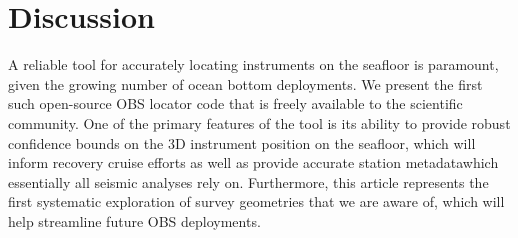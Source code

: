 \documentclass[10pt,titlepage]{article}
\providecommand{\DIFaddtex}[1]{{\protect\color{blue}\uwave{#1}}} %
\providecommand{\DIFaddbegin}{} %
\providecommand{\DIFaddend}{} %
\providecommand{\DIFdelbegin}{} %
\providecommand{\DIFdelend}{} %
\providecommand{\DIFadd}[1]{\texorpdfstring{\DIFaddtex{#1}}{#1}} %
\begin{document}
\DIFdelbegin %






\DIFdelend %
\section{Discussion }
A reliable tool for accurately locating instruments on the seafloor is paramount, given the growing number of ocean bottom deployments. We present the first such open-source OBS locator code that is freely available to the scientific community. One of the primary features of the tool is its ability to provide robust confidence bounds on the 3D instrument position on the seafloor, which will inform recovery cruise efforts as well as provide accurate station metadata\DIFaddbegin \DIFadd{, }\DIFaddend which essentially all seismic analyses rely on. Furthermore, this article represents the first systematic exploration of survey geometries that we are aware of, which will help streamline future OBS deployments.
\end{document}
